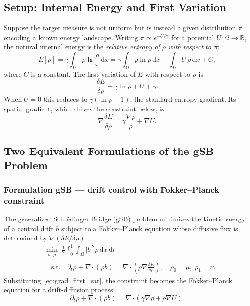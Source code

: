 \documentclass[11pt,a4paper]{article}
\newcommand{\R}{\mathbb{R}}
\newcommand{\ud}{\,\mathrm{d}}    %
\begin{document}
\subsection{Setup: Internal Energy and First Variation}

Suppose the target measure is not uniform but is instead a given distribution
$\pi$ encoding a known energy landscape.
Writing $\pi \propto e^{-U/\gamma}$ for a potential $U:\Omega\to\R$, the
natural internal energy is the \emph{relative entropy of $\rho$ with respect to $\pi$}:
\begin{equation}\label{eq:internal_energy}
  E[\rho]
    = \gamma\int_\Omega \rho\ln\frac{\rho}{\pi}\ud x
    = \gamma\int_\Omega \rho\ln\rho\ud x + \int_\Omega U\,\rho\ud x + C,
\end{equation}
where $C$ is a constant.  The first variation of $E$ with respect to $\rho$ is
\begin{equation}\label{eq:first_var}
  \frac{\delta E}{\delta\rho} = \gamma\ln\rho + U + \gamma.
\end{equation}
When $U=0$ this reduces to $\gamma(\ln\rho+1)$, the standard entropy gradient.
Its spatial gradient, which drives the constraint below, is
\begin{equation}\label{eq:grad_first_var}
  \nabla\frac{\delta E}{\delta\rho} = \gamma\frac{\nabla\rho}{\rho} + \nabla U.
\end{equation}

\subsection{Two Equivalent Formulations of the gSB Problem}

\subsubsection*{Formulation gSB — drift control with Fokker--Planck constraint}

The generalized Schr\"{o}dinger Bridge (gSB) problem minimizes the kinetic
energy of a control drift $b$ subject to a Fokker--Planck equation whose
diffusive flux is determined by $\nabla(\delta E/\delta\rho)$:
\begin{align}\label{eq:gSB}
  &\min_{b,\,\rho}\;\frac{1}{2}\int_0^1\!\int_\Omega |b|^2\rho\ud x\ud t\\
  &\quad\text{s.t.}\quad
   \partial_t\rho + \nabla\cdot(\rho b)
     = \nabla\cdot\!\left(\rho\nabla\frac{\delta E}{\delta\rho}\right),
   \quad \rho_0 = \mu,\;\rho_1=\nu.\nonumber
\end{align}
Substituting~\eqref{eq:grad_first_var}, the constraint becomes the
Fokker--Planck equation for a drift-diffusion process:
\begin{equation}\label{eq:FP_U}
  \partial_t\rho + \nabla\cdot(\rho b)
    = \nabla\cdot(\gamma\nabla\rho + \rho\nabla U).
\end{equation}
\end{document}
